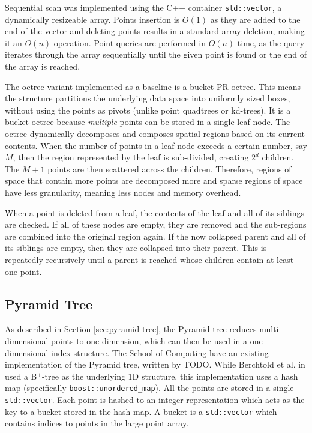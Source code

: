 Sequential scan was implemented using the C++ container \texttt{std::vector}, a dynamically resizeable array. Points insertion is $O(1)$ as they are added to the end of the vector and deleting points results in a standard array deletion, making it an $O(n)$ operation. Point queries are performed in $O(n)$ time, as the query iterates through the array sequentially until the given point is found or the end of the array is reached.

The octree variant implemented as a baseline is a bucket PR octree. This means the structure partitions the underlying data space into uniformly sized boxes, without using the points as pivots (unlike point quadtrees or kd-trees). It is a bucket octree because \textit{multiple} points can be stored in a single leaf node. The octree dynamically decomposes and composes spatial regions based on its current contents. When the number of points in a leaf node exceeds a certain number, say $M$, then the region represented by the leaf is sub-divided, creating $2^d$ children. The $M + 1$ points are then scattered across the children. Therefore, regions of space that contain more points are decomposed more and sparse regions of space have less granularity, meaning less nodes and memory overhead.

When a point is deleted from a leaf, the contents of the leaf and all of its siblings are checked. If all of these nodes are empty, they are removed and the sub-regions are combined into the original region again. If the now collapsed parent and all of its siblings are empty, then they are collapsed into their parent. This is repeatedly recursively until a parent is reached whose children contain at least one point.

\subsection{Pyramid Tree}

As described in Section \ref{sec:pyramid-tree}, the Pyramid tree reduces multi-dimensional points to one dimension, which can then be used in a one-dimensional index structure. The School of Computing have an existing implementation of the Pyramid tree, written by TODO. While Berchtold et al. in \cite{pyramid-tree} used a B${}^{+}$-tree as the underlying 1D structure, this implementation uses a hash map (specifically \texttt{boost::unordered\_map}). All the points are stored in a single \texttt{std::vector}. Each point is hashed to an integer representation which acts as the key to a bucket stored in the hash map. A bucket is
 a \texttt{std::vector} which contains indices to points in the large point array.
 
